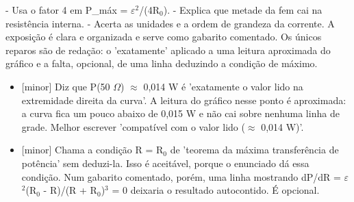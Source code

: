 \documentclass{article}%
\begin{document}
{-} Usa o fator 4 em P\_máx = $\varepsilon$$^2$/(4R$_{0}$).\newline%
{-} Explica que metade da fem cai na resistência interna.\newline%
{-} Acerta as unidades e a ordem de grandeza da corrente.\newline%
\newline%
A exposição é clara e organizada e serve como gabarito comentado. Os únicos reparos são de redação: o 'exatamente' aplicado a uma leitura aproximada do gráfico e a falta, opcional, de uma linha deduzindo a condição de máximo.%
\begin{itemize}%
\item%
{[}minor{]} Diz que P(50 $\Omega$) $\approx$ 0,014 W é 'exatamente o valor lido na extremidade direita da curva'. A leitura do gráfico nesse ponto é aproximada: a curva fica um pouco abaixo de 0,015 W e não cai sobre nenhuma linha de grade. Melhor escrever 'compatível com o valor lido ($\approx$ 0,014 W)'.%
\item%
{[}minor{]} Chama a condição R = R$_{0}$ de 'teorema da máxima transferência de potência' sem deduzi{-}la. Isso é aceitável, porque o enunciado dá essa condição. Num gabarito comentado, porém, uma linha mostrando dP/dR = $\varepsilon$$^2$(R$_{0}$ - R)/(R + R$_{0}$)$^3$ = 0 deixaria o resultado autocontido. É opcional.%
\end{itemize}%
\end{document}

